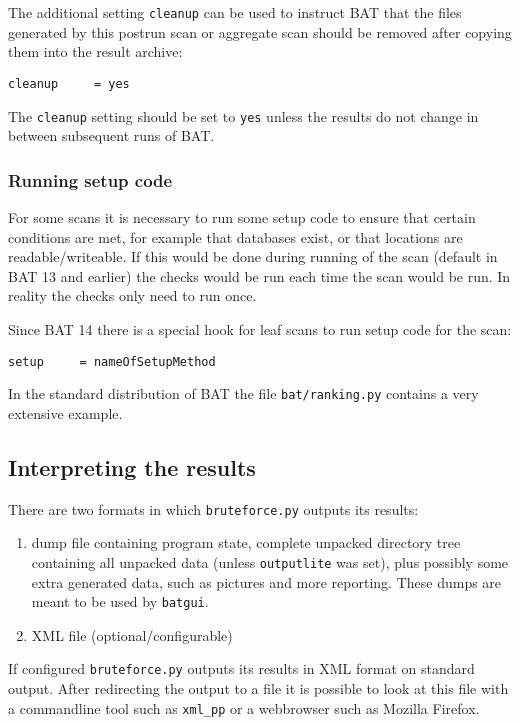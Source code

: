 \documentclass[10pt]{article}
\begin{document}
The additional setting \texttt{cleanup} can be used to instruct BAT that the
files generated by this postrun scan or aggregate scan should be removed after
copying them into the result archive:

\begin{verbatim}
cleanup     = yes
\end{verbatim}

The \texttt{cleanup} setting should be set to \texttt{yes} unless the results
do not change in between subsequent runs of BAT.

\subsubsection{Running setup code}

For some scans it is necessary to run some setup code to ensure that certain
conditions are met, for example that databases exist, or that locations are
readable/writeable. If this would be done during running of the scan (default
in BAT 13 and earlier) the checks would be run each time the scan would be run.
In reality the checks only need to run once.

Since BAT 14 there is a special hook for leaf scans to run setup code for the
scan:

\begin{verbatim}
setup     = nameOfSetupMethod
\end{verbatim}

In the standard distribution of BAT the file \texttt{bat/ranking.py} contains a
very extensive example.

\subsection{Interpreting the results}

There are two formats in which \texttt{bruteforce.py} outputs its results:

\begin{enumerate}
\item dump file containing program state, complete unpacked directory tree
containing all unpacked data (unless \texttt{outputlite} was set), plus
possibly some extra generated data, such as pictures and more reporting. These
dumps are meant to be used by \texttt{batgui}.
\item XML file (optional/configurable)
\end{enumerate}

If configured \texttt{bruteforce.py} outputs its results in XML format on
standard output. After redirecting the output to a file it is possible to look
at this file with a commandline tool such as \texttt{xml\_pp} or a webbrowser
such as Mozilla Firefox.
\end{document}
